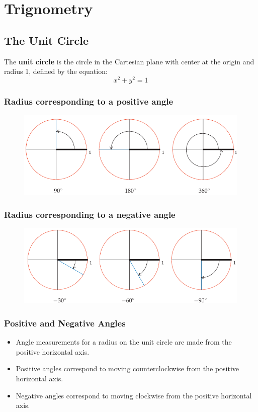 \chapter{Trignometry}
\author{Nithin}

\section{The Unit Circle}
The \textbf{unit circle} is the circle in the Cartesian plane with center at the origin and radius 1, defined by the equation:
\[ x^2 + y^2 = 1 \]

\subsection{Radius corresponding to a positive angle}
\begin{figure}
    \centering
    \includegraphics[scale=0.5]{pics/1.png}
\end{figure}

\subsection{Radius corresponding to a negative angle}
\begin{figure}
    \centering
    \includegraphics[scale=0.5]{pics/2.png}
\end{figure}

\subsection{Positive and Negative Angles}
\begin{itemize}
    \item Angle measurements for a radius on the unit circle are made from the positive horizontal axis.
    \item Positive angles correspond to moving counterclockwise from the positive horizontal axis.
    \item Negative angles correspond to moving clockwise from the positive horizontal axis.
\end{itemize}

